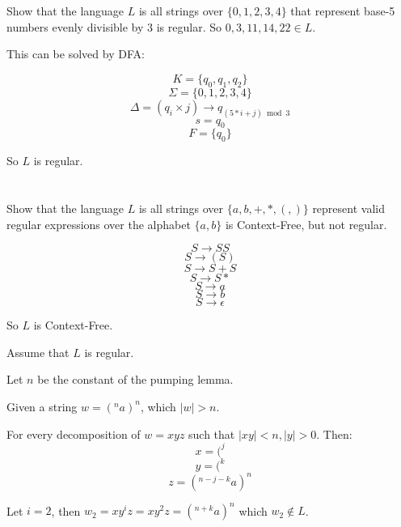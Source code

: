 \documentclass[paper=a4, fontsize=11pt]{scrartcl} %
\begin{document}
\pagebreak

\section{}

\begin{fancyquotes}
  Show that the language $L$ is all strings over $\{0,1,2,3,4\}$ that
  represent base-5 numbers evenly divisible by $3$ is regular. So $0,
  3, 11, 14, 22 \in L$.
\end{fancyquotes}

This can be solved by DFA:

$$K = \{q_0, q_1, q_2\}$$
$$\Sigma = \{0,1,2,3,4\}$$
$$\Delta = (q_i\times j)\rightarrow q_{(5*i+j)\bmod 3}$$
$$s = q_0$$
$$F = \{q_0\}$$

So $L$ is regular.

\pagebreak

\section{}

\begin{fancyquotes}
  Show that the language $L$ is all strings over $\{a,b,+,*,(,)\}$
  represent valid regular expressions over the alphabet $\{a,b\}$ is
  Context-Free, but not regular.
\end{fancyquotes}

$$S \rightarrow SS$$
$$S \rightarrow (S)$$
$$S \rightarrow S+S$$
$$S \rightarrow S*$$
$$S \rightarrow a$$
$$S \rightarrow b$$
$$S \rightarrow \epsilon$$

So $L$ is Context-Free.

Assume that $L$ is regular.

Let $n$ be the constant of the pumping lemma.

Given a string $w = (^{n}a)^{n}$, which $|w|>n$.

For every decomposition of $w=xyz$ such that $|xy|<n, |y|>0$.
Then:
$$x=(^{j}$$
$$y=(^{k}$$
$$z=(^{n-j-k}a)^{n}$$

Let $i=2$, then $w_2=xy^{i}z=xy^2z=(^{n+k}a)^{n}$ which $w_2\not\in
L$.
\end{document}
